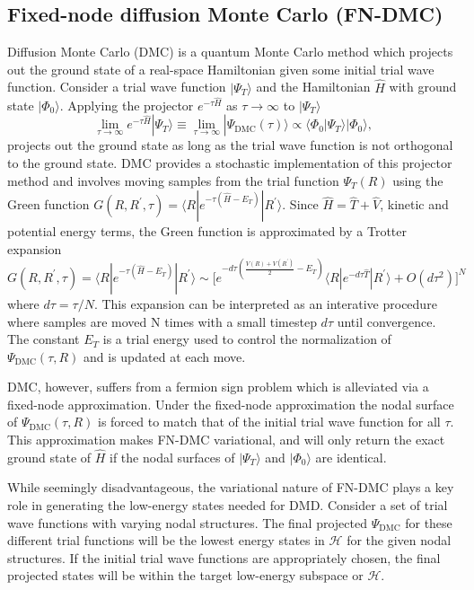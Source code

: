 \documentclass[12pt]{article}
\begin{document}
\subsection{Fixed-node diffusion Monte Carlo (FN-DMC)}
Diffusion Monte Carlo (DMC) is a quantum Monte Carlo method which projects out the ground state of a real-space Hamiltonian given some initial trial wave function.
Consider a trial wave function $|\Psi_T\rangle$ and the Hamiltonian $\hat{H}$ with ground state $|\Phi_0\rangle$. 
Applying the projector $e^{-\tau \hat{H}}$ as $\tau \rightarrow \infty$ to $|\Psi_T \rangle$
\begin{equation}
\lim_{\tau \rightarrow \infty} e^{-\tau \hat{H}} |\Psi_T\rangle 
\equiv \lim_{\tau \rightarrow \infty} |\Psi_\text{DMC}(\tau)\rangle \propto \langle \Phi_0|\Psi_T\rangle |\Phi_0\rangle,
\end{equation}
projects out the ground state as long as the trial wave function is not orthogonal to the ground state. 
DMC provides a stochastic implementation of this projector method and involves moving samples from the trial function $\Psi_T(R)$ using the Green function $G(R, R^\prime, \tau) = \langle R | e^{-\tau(\hat{H} - E_T)} | R^\prime \rangle$. 
Since $\hat{H} = \hat{T} + \hat{V}$, kinetic and potential energy terms, the Green function is approximated by a Trotter expansion 
$$G(R, R^\prime, \tau) = \langle R | e^{-\tau(\hat{H} - E_T)} | R^\prime \rangle \sim \Big[e^{-d\tau(\frac{V(R) + V(R^\prime)}{2} - E_T)} \langle R| e^{-d\tau\hat{T}}|R^\prime \rangle + O(d\tau^2) \Big]^N $$ 
where $d\tau = \tau/N$.
This expansion can be interpreted as an interative procedure where samples are moved N times with a small timestep $d\tau$ until convergence.
The constant $E_T$ is a trial energy used to control the normalization of $\Psi_\text{DMC}(\tau, R)$ and is updated at each move.

DMC, however, suffers from a fermion sign problem which is alleviated via a fixed-node approximation.
Under the fixed-node approximation the nodal surface of $\Psi_\text{DMC}(\tau, R)$ is forced to match that of the initial trial wave function for all $\tau$.
This approximation makes FN-DMC variational, and will only return the exact ground state of $\hat{H}$ if the nodal surfaces of $|\Psi_T\rangle$ and $|\Phi_0\rangle$ are identical.

While seemingly disadvantageous, the variational nature of FN-DMC plays
a key role in generating the low-energy states needed for DMD.
Consider a set of trial wave functions with varying nodal structures.
The final projected $\Psi_\text{DMC}$ for these different trial functions will be the lowest energy states in $\mathcal{H}$ for the given nodal structures.
If the initial trial wave functions are appropriately chosen, the final projected states will be within the target low-energy subspace or $\mathcal{H}$.
\end{document}
